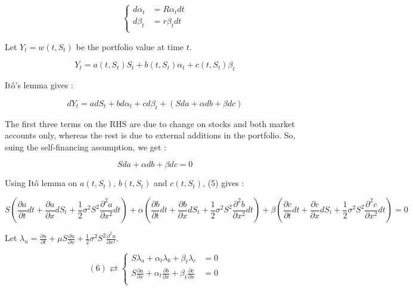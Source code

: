 \documentclass[english,a4paper,12pt,titlepage]{book}
\begin{document}
\begin{equation}
\left\{
\begin{aligned}
d\alpha_t &= R \alpha_t dt\\
d\beta_t &= r \beta_t dt\\
\end{aligned}
\right.
\end{equation}

Let $Y_t=w(t,S_t)$ be the portfolio value at time $t$. 

\begin{equation}
Y_t= a(t,S_t)S_t+ b(t,S_t)\alpha_t + c(t,S_t)\beta_t 
\end{equation}

Itô's lemma gives : 

\begin{equation}
dY_t=adS_t+bd\alpha_t+cd\beta_t+ (Sda+\alpha db + \beta dc)
\end{equation}

The first three terms on the RHS are due to change on stocks and both market accounts only, whereas the rest is due to external additions in the portfolio. So, suing the self-financing assumption, we get : 

\begin{equation}
Sda+\alpha db + \beta dc=0
\end{equation}

Using Itô lemma on $a(t,S_t)$, $b(t,S_t)$ and $c(t,S_t)$, (5) gives : 

\begin{equation}
S(\frac{\partial a}{\partial t}dt + \frac{\partial a}{\partial x}dS_t+ \frac{1}{2}\sigma^2 S^2\frac{\partial^2 a}{\partial x^2}dt) + \alpha (\frac{\partial b}{\partial t}dt + \frac{\partial b}{\partial x}dS_t+ \frac{1}{2}\sigma^2 S^2\frac{\partial^2 b}{\partial x^2}dt) + \beta (\frac{\partial c}{\partial t}dt + \frac{\partial c}{\partial x}dS_t+ \frac{1}{2}\sigma^2 S^2\frac{\partial^2 c}{\partial x^2}dt)=0
\end{equation}


Let $\lambda_u=\frac{\partial u}{\partial t}+ \mu S \frac{\partial u}{\partial x} + \frac{1}{2}\sigma^2 S^2\frac{\partial^2 u}{\partial x^2} $. 


\begin{equation}
(6) \rightleftarrows 
\left\{
\begin{aligned}
S \lambda_a + \alpha_t\lambda_b + \beta_t\lambda_c &= 0 \\
 S\frac{\partial a}{\partial x} + \alpha_t \frac{\partial b}{\partial x}  +  \beta_t \frac{\partial c}{\partial x}   &= 0\\
\end{aligned}
\right.
\end{equation}
\end{document}
